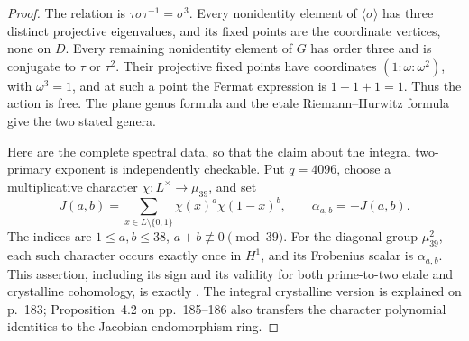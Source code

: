 \documentclass[11pt]{article}
\begin{document}
\begin{proof}
The relation is \(\tau\sigma\tau^{-1}=\sigma^3\).
Every nonidentity element of \(\langle\sigma\rangle\)
has three distinct projective eigenvalues, and its fixed
points are the coordinate vertices, none on \(D\).
Every remaining nonidentity element of \(G\) has order
three and is conjugate to \(\tau\) or \(\tau^2\).
Their projective fixed points have coordinates
\((1:\omega:\omega^2)\), with \(\omega^3=1\),
and at such a point the Fermat expression is
\(1+1+1=1\). Thus the action is free.
The plane genus formula and the etale Riemann--Hurwitz
formula give the two stated genera.

Here are the complete spectral data, so that the claim
about the integral two-primary exponent is independently
checkable. Put \(q=4096\), choose a multiplicative
character \(\chi:L^\times\to\mu_{39}\), and set
\[
 J(a,b)=\sum_{x\in L\setminus\{0,1\}}
                   \chi(x)^a\chi(1-x)^b,
 \qquad \alpha_{a,b}=-J(a,b).
\]
The indices are \(1\le a,b\le38\), \(a+b\not\equiv0\pmod{39}\).
For the diagonal group \(\mu_{39}^2\), each such character
occurs exactly once in \(H^1\), and its Frobenius scalar is
\(\alpha_{a,b}\). This assertion, including its sign and its
validity for both prime-to-two etale and crystalline cohomology,
is exactly \cite[Corollary~2.4, p.~181]{AC_Katz1981}.
The integral crystalline version is explained on p.~183;
Proposition~4.2 on pp.~185--186 also transfers the character
polynomial identities to the Jacobian endomorphism ring.


\end{proof}
\end{document}
